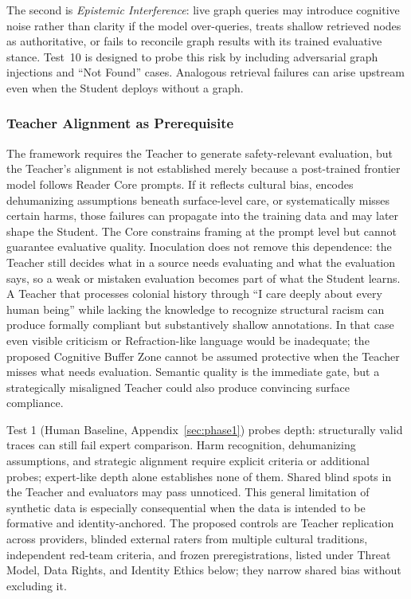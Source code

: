 \documentclass[11pt]{article}
\begin{document}
The second is \emph{Epistemic Interference}: live graph queries may introduce
cognitive noise rather than clarity if the model over-queries, treats shallow
retrieved nodes as authoritative, or fails to reconcile graph results with its
trained evaluative stance. Test~10 is designed to probe this risk by including
adversarial graph injections and ``Not Found'' cases. Analogous retrieval failures can arise upstream even when the Student deploys without a graph.

\subsubsection{Teacher Alignment as Prerequisite}\label{sec:teacher-alignment}

The framework requires the Teacher to generate safety-relevant evaluation, but
the Teacher's alignment is not established merely because a post-trained
frontier model follows Reader Core prompts. If it reflects cultural bias,
encodes dehumanizing assumptions beneath surface-level care, or systematically
misses certain harms, those failures can propagate into the training data and
may later shape the Student. The Core constrains framing at the prompt level but
cannot guarantee evaluative quality. Inoculation does not remove this
dependence: the Teacher still decides what in a source needs evaluating and
what the evaluation says, so a weak or mistaken evaluation becomes part of what
the Student learns. A Teacher that processes colonial history
through ``I care deeply about every human being'' while lacking the knowledge to
recognize structural racism can produce formally compliant but substantively
shallow annotations. In that case even visible criticism or Refraction-like
language would be inadequate; the proposed Cognitive Buffer Zone cannot be assumed protective when the Teacher misses what needs evaluation. Semantic quality is the immediate gate, but a strategically misaligned Teacher could also produce convincing surface compliance.

Test 1 (Human Baseline, Appendix~\ref{sec:phase1}) probes depth: structurally
valid traces can still fail expert comparison. Harm recognition, dehumanizing
assumptions, and strategic alignment require explicit criteria or additional
probes; expert-like depth alone establishes none of them. Shared blind spots in the
Teacher and evaluators may pass unnoticed. This general limitation of synthetic
data is especially consequential when the data is intended to be formative and
identity-anchored. The proposed controls are Teacher replication across
providers, blinded external raters from multiple cultural traditions,
independent red-team criteria, and frozen preregistrations, listed under
Threat Model, Data Rights, and Identity Ethics below; they narrow shared bias
without excluding it.
\end{document}
